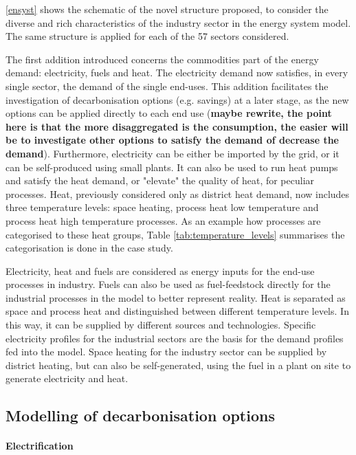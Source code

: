 \documentclass[review]{elsarticle}
\begin{document}
\autoref{ensyst} shows the schematic of the novel structure proposed, to consider the diverse and rich characteristics of the industry sector in the energy system model. The same structure is applied for each of the 57 sectors considered. 

The first addition introduced concerns the commodities part of the energy demand: electricity, fuels and heat.
The electricity demand now satisfies, in every single sector, the demand of the single end-uses. This addition facilitates the investigation of decarbonisation options (e.g. savings) at a later stage, as the new options can be applied directly to each end use (\textbf{maybe rewrite, the point here is that the more disaggregated is the consumption, the easier will be to investigate other options to satisfy the demand of decrease the demand}). 
Furthermore, electricity can be either be imported by the grid, or it can be self-produced using small plants. It can also be used to run heat pumps and satisfy the heat demand, or "elevate" the quality of heat, for peculiar processes. 
Heat, previously considered only as district heat demand, now includes three temperature levels: space heating, process heat low temperature and process heat high temperature processes. As an example how processes are categorised to these heat groups, Table \ref{tab:temperature_levels} summarises the categorisation is done in the case study.


Electricity, heat and fuels are considered as energy inputs for the end-use processes in industry. 
Fuels can also be used as fuel-feedstock directly for the industrial processes in the model to better represent reality. 
Heat is separated as space and process heat and distinguished between different temperature levels. In this way, it can be supplied by different sources and technologies.
Specific electricity profiles for the industrial sectors are the basis for the demand profiles fed into the model. Space heating for the industry sector can be supplied by district heating, but can also be self-generated, using the fuel in a plant on site to generate electricity and heat.


\subsection{Modelling of decarbonisation options}

\paragraph{Electrification}
\end{document}
